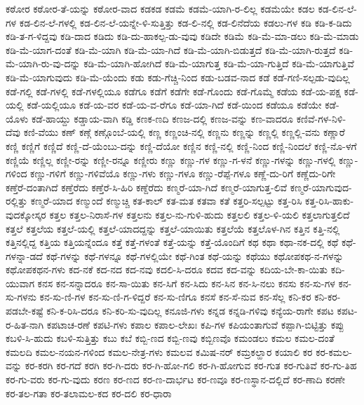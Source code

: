 {ಕಠೋರ
ಕಠೋರ-ತೆ-ಯನ್ನು
ಕಠೋರ-ವಾದ
ಕಡಕಡ
ಕಡಮೆ
ಕಡಮೆ-ಯಾಗಿ-ರ-ಲಿಲ್ಲ
ಕಡಮೆಯೇ
ಕಡಲ
ಕಡ-ಲಿನ-ಲೆ-ಗಳ
ಕಡ-ಲಿನ-ಲೆ-ಗಳಲ್ಲಿ
ಕಡ-ಲಿನ-ಲೆ-ಯನ್ನೇ-ಳಿ-ಸುತ್ತಿತ್ತು
ಕಡ-ಲಿ-ನಲ್ಲಿ
ಕಡ-ಲಿನೆದೆಯ
ಕಡಲು-ಗಳ
ಕಡಿ
ಕಡಿ-ಕ-ಡಿದು
ಕಡಿ-ತ-ಗ-ಳಿದ್ದವು
ಕಡಿ-ದಾದ
ಕಡಿದು
ಕಡಿ-ದು-ಹಾಕಲ್ಪ-ಡು-ವುವು
ಕಡಿದೇ
ಕಡಿಮೆ
ಕಡಿ-ಮೆ-ಮಾ-ಡಲು
ಕಡಿ-ಮೆ-ಮಾಡು
ಕಡಿ-ಮೆ-ಯಾಗ-ದಂತೆ
ಕಡಿ-ಮೆ-ಯಾಗಿ
ಕಡಿ-ಮೆ-ಯಾ-ಗಿದೆ
ಕಡಿ-ಮೆ-ಯಾಗಿ-ಬಿಡುತ್ತದೆ
ಕಡಿ-ಮೆ-ಯಾಗಿ-ರುತ್ತದೆ
ಕಡಿ-ಮೆ-ಯಾಗಿ-ರು-ವು-ದನ್ನು
ಕಡಿ-ಮೆ-ಯಾಗಿ-ಹೋಗಿದೆ
ಕಡಿ-ಮೆ-ಯಾಗುತ್ತ
ಕಡಿ-ಮೆ-ಯಾ-ಗುತ್ತಿದೆ
ಕಡಿ-ಮೆ-ಯಾಗುತ್ತಿವೆ
ಕಡಿ-ಮೆ-ಯಾಗುವುದು
ಕಡಿ-ಮೆ-ಯೆಂದು
ಕಡು
ಕಡು-ಗೆಚ್ಚಿ-ನಿಂದ
ಕಡು-ಬಡವ-ನಾದ
ಕಡೆ
ಕಡೆ-ಗಣಿ-ಸಲ್ಪಡು-ವುದಿಲ್ಲ
ಕಡೆ-ಗಲ್ಲಿ
ಕಡೆ-ಗಳಲ್ಲಿ
ಕಡೆ-ಗಳಲ್ಲಿಯೂ
ಕಡೆಗೂ
ಕಡೆಗೆ
ಕಡೆಗೇ
ಕಡೆ-ಗೊಂದು
ಕಡೆ-ಗೊಮ್ಮೆ
ಕಡೆಯ
ಕಡೆ-ಯ-ಪಕ್ಷ
ಕಡೆ-ಯಲ್ಲಿ
ಕಡೆ-ಯಲ್ಲಿಯೂ
ಕಡೆ-ಯ-ವರ
ಕಡೆ-ಯ-ವ-ರೆಗೂ
ಕಡೆ-ಯಾ-ಗಿದೆ
ಕಡೆ-ಯಿಂದ
ಕಡೆಯೂ
ಕಡೆಯೇ
ಕಡೆ-ಯೊಳು
ಕಡೆ-ಹಾಯ್ದು
ಕಡ್ಡಾಯ-ವಾಗಿ
ಕಡ್ಡಿ
ಕಣಕ-ಣದಿ
ಕಣಜ-ದಲ್ಲಿ
ಕಣಜ-ವನ್ನು
ಕಣ-ವಾದರೂ
ಕಣಿವೆ-ಗಳ-ನಿಳಿ-ದೆವು
ಕಣಿ-ವೆಯು
ಕಣ್
ಕಣ್ಗೆ
ಕಣ್ಗೊಂಬೆ-ಯಲ್ಲಿ
ಕಣ್ಣ
ಕಣ್ಣಂಚಿ-ನಲ್ಲಿ
ಕಣ್ಣನು
ಕಣ್ಣನ್ನು
ಕಣ್ಣಲ್ಲಿ
ಕಣ್ಣಲ್ಲಿ-ವನು
ಕಣ್ಣಾರೆ
ಕಣ್ಣಿ
ಕಣ್ಣಿಗೆ
ಕಣ್ಣಿದೆ
ಕಣ್ಣಿ-ದೆ-ಯೆಂಬು-ದನ್ನು
ಕಣ್ಣಿ-ದೆಯೋ
ಕಣ್ಣಿನ
ಕಣ್ಣಿ-ನಲ್ಲಿ
ಕಣ್ಣಿ-ನಿಂದ
ಕಣ್ಣಿ-ನಿಂದಲೆ
ಕಣ್ಣಿ-ನೊ-ಳಗೆ
ಕಣ್ಣಿಯೆ
ಕಣ್ಣಿಲ್ಲ
ಕಣ್ಣೀ-ರನ್ನು
ಕಣ್ಣೀ-ರನ್ನೂ
ಕಣ್ಣೀರು
ಕಣ್ಣು
ಕಣ್ಣು-ಗಳ
ಕಣ್ಣು-ಗ-ಳನೆ
ಕಣ್ಣು-ಗಳನ್ನು
ಕಣ್ಣು-ಗಳಲ್ಲಿ
ಕಣ್ಣು-ಗಳಿಂದ
ಕಣ್ಣು-ಗಳಿಗೆ
ಕಣ್ಣು-ಗಳಿವೆಯೊ
ಕಣ್ಣು-ಗಳು
ಕಣ್ಣು-ಗಳೂ
ಕಣ್ಣು-ರೆಪ್ಪೆ-ಗಳೂ
ಕಣ್ಣೆ-ದು-ರಿಗೆ
ಕಣ್ಣೆದು-ರಿಗೇ
ಕಣ್ತೆರೆ-ದಂತಾಗಿದೆ
ಕಣ್ತೆರೆದು
ಕಣ್ತೆರೆ-ಸಿ-ಹಿರಿ
ಕಣ್ದೆರೆದು
ಕಣ್ಮರೆ-ಯಾ-ಗಿದೆ
ಕಣ್ಮರೆ-ಯಾಗುತ್ತ-ಲಿವೆ
ಕಣ್ಮರೆ-ಯಾಗುವುದ-ರಲ್ಲಿತ್ತು
ಕಣ್ಮರೆ-ಯಾದ
ಕಣ್ಮುಂದೆ
ಕಣ್ಮುಚ್ಚಿ
ಕತ-ಕಾಲ್
ಕತ-ಮತ
ಕತವಾ
ಕತೆ
ಕತ್ತರಿ-ಸಲ್ಪಟ್ಟು
ಕತ್ತ-ರಿಸಿ
ಕತ್ತ-ರಿಸಿ-ಹಾಕು-ವುದಕ್ಕೋಸ್ಕರ
ಕತ್ತಲ
ಕತ್ತಲ-ನಿರಾಸೆ-ಗಳ
ಕತ್ತಲನು
ಕತ್ತಲ-ನು-ಗುಳಿ-ಹುದು
ಕತ್ತಲಲಿ
ಕತ್ತಲ-ಳಿ-ಯಲಿ
ಕತ್ತಲಾಗುತ್ತಲಿದೆ
ಕತ್ತಲೆ
ಕತ್ತಲೆಯ
ಕತ್ತಲೆ-ಯಲ್ಲಿ
ಕತ್ತಲೆ-ಯಾದದ್ದನ್ನು
ಕತ್ತಲೆ-ಯಾಯಿತು
ಕತ್ತಲೆಯೆ
ಕತ್ತಲೊಳ-ಗಿನ
ಕತ್ತಿನ
ಕತ್ತಿ-ನಲ್ಲಿ
ಕತ್ತಿನಲ್ಲಿದ್ದ
ಕತ್ತಿಯ
ಕತ್ತಿಯನ್ನೆಂದೂ
ಕತ್ತೆ
ಕತ್ತೆ-ಗಳಂತೆ
ಕತ್ತೆ-ಯನ್ನು
ಕತ್ತೆ-ಯೊಂದಿಗೆ
ಕಥ
ಕಥಾ
ಕಥಾ-ನಕ-ದಲ್ಲಿ
ಕಥೆ
ಕಥೆ-ಗಳನ್ನಾ-ಡದೆ
ಕಥೆ-ಗಳನ್ನು
ಕಥೆ-ಗಳನ್ನೂ
ಕಥೆ-ಗಳಲ್ಲಿಯೇ
ಕಥೆ-ಗಿಂತ
ಕಥೆ-ಯನ್ನು
ಕಥೆಯು
ಕಥೋಪಕಥ-ನ-ಗಳನ್ನು
ಕಥೋಪಕಥನ-ಗಳು
ಕದ-ನಕೆ
ಕದ-ನದ
ಕದ-ನವು
ಕದಲಿ-ಸಿ-ದರೂ
ಕದವ
ಕದ-ವನ್ನು
ಕದಿಯ-ಬೇ-ಕಾ-ಯಿತು
ಕದಿ-ಯುವಾಗ
ಕನಸ
ಕನ-ಸನ್ನಾದರೂ
ಕನ-ಸಾ-ಯಿತು
ಕನ-ಸಿಗೆ
ಕನ-ಸಿದು
ಕನ-ಸಿನ
ಕನ-ಸಿ-ನಲು
ಕನಸು
ಕನ-ಸು-ಗಳ
ಕನ-ಸು-ಗಳನು
ಕನ-ಸು-ಣಿ-ಗಳ
ಕನ-ಸು-ಣಿ-ಗ-ಳಿದ್ದರೆ
ಕನ-ಸು-ಣಿಗೂ
ಕನಸೆ
ಕನ-ಸೆ-ನುವ
ಕನ-ಸೆಲ್ಲ
ಕನಿ-ಕರ
ಕನಿ-ಕರ-ಪಡಬೇ-ಕಷ್ಟೆ
ಕನಿ-ಕ-ರಿಸಿ-ದರೂ
ಕನಿ-ಕರಿ-ಸು-ವುದಿಲ್ಲ
ಕನೂಜಿ-ಗಳು
ಕನ್ನಡ
ಕನ್ನಡಿ-ಗಳಿವು
ಕನ್ಯೆಯ-ರಾಗೇ
ಕಪಟ
ಕಪಟ-ರ-ಹಿತ-ನಾಗಿ
ಕಪಟಾಚ-ರಣೆ
ಕಪಟಿ-ಗಳು
ಕಪಾಲ
ಕಪಾಲ-ಲೇಖಃ
ಕಪಿ-ಗಳ
ಕಪಿಯಂತಾಗುವೆ
ಕಪ್ಪಾಗಿ-ಬಿಟ್ಟಿತ್ತು
ಕಪ್ಪು
ಕಬಳಿ-ಸಿ-ಹುದು
ಕಬಳಿ-ಸುತ್ತಿತ್ತು
ಕಬು
ಕಬೆ
ಕಬ್ಬಿ-ಣದ
ಕಬ್ಬಿ-ಣವು
ಕಬ್ಬಿಣವೊ
ಕಮಂಡಲು
ಕಮಲ
ಕಮಲ-ದಂತೆ
ಕಮಲದಿ
ಕಮಲ-ನಯನ-ಗಳಿಂದ
ಕಮಲ-ನೇತ್ರ-ಗಳು
ಕಮಲವ
ಕಮಿಷ-ನರ್
ಕಮ್ರಕಲ್ಹಾರ
ಕಯಾಲಿ
ಕರ
ಕರ-ಕಮಲ-ವನ್ನು
ಕರ-ಕರಗಿ
ಕರ-ಗದೆ
ಕರಗಿ
ಕರ-ಗಿ-ದರು
ಕರ-ಗಿ-ಹೋ-ಗಲಿ
ಕರ-ಗಿ-ಹೋಗುವ
ಕರ-ಗುತ
ಕರ-ಗುತಿವೆ
ಕರ-ಗು-ತಿಹ
ಕರ-ಗು-ವರು
ಕರ-ಗು-ವುದು
ಕರಣ
ಕರ-ಣದ
ಕರ-ಣ-ದಾರ್ಭಟ
ಕರ-ಣವೂ
ಕರ-ಣಸ್ಥಾನ-ದಲ್ಲಿದೆ
ಕರ-ಣಾದಿ
ಕರಣೇ
ಕರ-ತಲ-ಗತಾ
ಕರ-ತಲಾಮಲ-ಕದ
ಕರ-ದಲಿ
ಕರ-ಧಾರಾ
}
